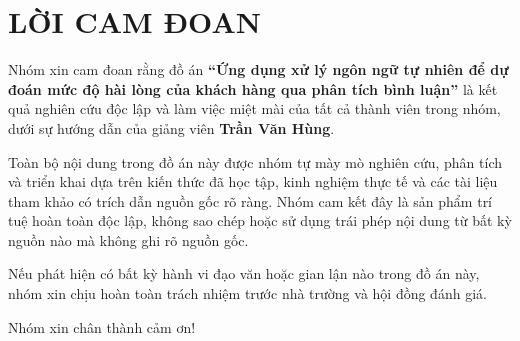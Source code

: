 
\newpage

\section*{\textbf{LỜI CAM ĐOAN}}
{}

Nhóm xin cam đoan rằng đồ án \textbf{“Ứng dụng xử lý ngôn ngữ tự nhiên để dự đoán mức độ hài lòng của khách hàng qua phân tích bình luận”} là kết quả nghiên cứu độc lập và làm việc miệt mài của tất cả thành viên trong nhóm, dưới sự hướng dẫn của giảng viên \textbf{Trần Văn Hùng}.

Toàn bộ nội dung trong đồ án này được nhóm tự mày mò nghiên cứu, phân tích và triển khai dựa trên kiến thức đã học tập, kinh nghiệm thực tế và các tài liệu tham khảo có trích dẫn nguồn gốc rõ ràng. Nhóm cam kết đây là sản phẩm trí tuệ hoàn toàn độc lập, không sao chép hoặc sử dụng trái phép nội dung từ bất kỳ nguồn nào mà không ghi rõ nguồn gốc.

Nếu phát hiện có bất kỳ hành vi đạo văn hoặc gian lận nào trong đồ án này, nhóm xin chịu hoàn toàn trách nhiệm trước nhà trường và hội đồng đánh giá.

Nhóm xin chân thành cảm ơn!

 
